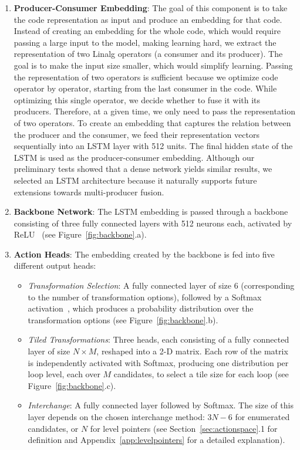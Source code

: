 \documentclass[10pt,twocolumn]{article}
\begin{document}
\begin{enumerate}
\item \textbf{Producer-Consumer Embedding}: The goal of this component is to take the code representation as input and produce an embedding for that code. Instead of creating an embedding for the whole code, which would require passing a large input to the model, making learning hard, we extract the representation of two Linalg operators (a consumer and its producer). The goal is to make the input size smaller, which would simplify learning. Passing the representation of two operators is sufficient because we optimize code operator by operator, starting from the last consumer in the code. While optimizing this single operator, we decide whether to fuse it with its producers. Therefore, at a given time, we only need to pass the representation of two operators. To create an embedding that captures the relation between the producer and the consumer, we feed their representation vectors sequentially into an LSTM layer with 512 units. The final hidden state of the LSTM is used as the producer-consumer embedding. Although our preliminary tests showed that a dense network yields similar results, we selected an LSTM architecture because it naturally supports future extensions towards multi-producer fusion.
\item \textbf{Backbone Network}: The LSTM embedding is passed through a backbone consisting of three fully connected layers with 512 neurons each, activated by ReLU~\cite{ref53} (see Figure~\ref{fig:backbone}.a).
\item \textbf{Action Heads}: The embedding created by the backbone is fed into five different output heads:
\begin{itemize}
\item \emph{Transformation Selection}: A fully connected layer of size 6 (corresponding to the number of transformation options), followed by a Softmax activation~\cite{ref53}, which produces a probability distribution over the transformation options (see Figure~\ref{fig:backbone}.b).
\item \emph{Tiled Transformations}: Three heads, each consisting of a fully connected layer of size $N \times M$, reshaped into a 2-D matrix. Each row of the matrix is independently activated with Softmax, producing one distribution per loop level, each over $M$ candidates, to select a tile size for each loop (see Figure~\ref{fig:backbone}.c).
\item \emph{Interchange}: A fully connected layer followed by Softmax. The size of this layer depends on the chosen interchange method: $3N - 6$ for enumerated candidates, or $N$ for level pointers (see Section~\ref{sec:actionspace}.1 for definition and Appendix~\ref{app:levelpointers} for a detailed explanation).
\end{itemize}
\end{enumerate}
\end{document}
